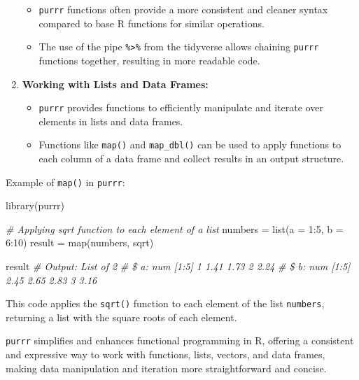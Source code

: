 \documentclass[
]{article}
\newenvironment{Shaded}{}{}
\newcommand{\AttributeTok}[1]{\textcolor[rgb]{0.49,0.56,0.16}{#1}}
\newcommand{\CommentTok}[1]{\textcolor[rgb]{0.38,0.63,0.69}{\textit{#1}}}
\newcommand{\DecValTok}[1]{\textcolor[rgb]{0.25,0.63,0.44}{#1}}
\newcommand{\FunctionTok}[1]{\textcolor[rgb]{0.02,0.16,0.49}{#1}}
\newcommand{\NormalTok}[1]{#1}
\newcommand{\OtherTok}[1]{\textcolor[rgb]{0.00,0.44,0.13}{#1}}
\newcommand{\SpecialCharTok}[1]{\textcolor[rgb]{0.25,0.44,0.63}{#1}}
\begin{document}
\begin{enumerate}
  \begin{itemize}
  \item
    \texttt{purrr} functions often provide a more consistent and cleaner
    syntax compared to base R functions for similar operations.
  \item
    The use of the pipe \texttt{\%\textgreater{}\%} from the tidyverse
    allows chaining \texttt{purrr} functions together, resulting in more
    readable code.
  \end{itemize}
\item
  \textbf{Working with Lists and Data Frames:}

  \begin{itemize}
  \item
    \texttt{purrr} provides functions to efficiently manipulate and
    iterate over elements in lists and data frames.
  \item
    Functions like \texttt{map()} and \texttt{map\_dbl()} can be used to
    apply functions to each column of a data frame and collect results
    in an output structure.
  \end{itemize}
\end{enumerate}

Example of \texttt{map()} in \texttt{purrr}:

\begin{Shaded}
\begin{Highlighting}[]
\FunctionTok{library}\NormalTok{(purrr)}

\CommentTok{\# Applying sqrt function to each element of a list}
\NormalTok{numbers }\OtherTok{=} \FunctionTok{list}\NormalTok{(}\AttributeTok{a =} \DecValTok{1}\SpecialCharTok{:}\DecValTok{5}\NormalTok{, }\AttributeTok{b =} \DecValTok{6}\SpecialCharTok{:}\DecValTok{10}\NormalTok{)}
\NormalTok{result }\OtherTok{=} \FunctionTok{map}\NormalTok{(numbers, sqrt)}

\NormalTok{result}
\CommentTok{\# Output: List of 2}
\CommentTok{\# \$ a: num [1:5] 1 1.41 1.73 2 2.24}
\CommentTok{\# \$ b: num [1:5] 2.45 2.65 2.83 3 3.16}
\end{Highlighting}
\end{Shaded}

This code applies the \texttt{sqrt()} function to each element of the
list \texttt{numbers}, returning a list with the square roots of each
element.

\texttt{purrr} simplifies and enhances functional programming in R,
offering a consistent and expressive way to work with functions, lists,
vectors, and data frames, making data manipulation and iteration more
straightforward and concise.
\end{document}
